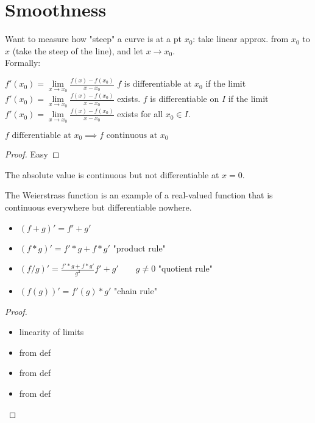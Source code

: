 \chapter{Smoothness}

Want to measure how "steep" a curve is at a pt $x_0$: take linear approx. from $x_0$ to $x$ (take the steep of the line), and let $x \to x_0$.\\
Formally:
\begin{definition}
	$f'(x_0) = \lim\limits_{x \to x_0} \frac{f(x) - f(x_0)}{x - x_0}$
	$f$ is differentiable at $x_0$ if the limit $f'(x_0) = \lim\limits_{x \to x_0} \frac{f(x) - f(x_0)}{x - x_0}$ exists.
	$f$ is differentiable on $I$ if the limit $f'(x_0) = \lim\limits_{x \to x_0} \frac{f(x) - f(x_0)}{x - x_0}$ exists for all $x_0 \in I$.
\end{definition}

\begin{property}
	$f \text{ differentiable at } x_0 \implies f  \text{ continuous at } x_0$ 
\end{property}
\begin{proof}
	Easy
\end{proof}
The absolute value is continuous but not differentiable at $x=0$.

The Weierstrass function is an example of a real-valued function that is continuous everywhere but differentiable nowhere.

\begin{property}
	\begin{itemize}
		\item $\left( f+g \right)' = f'+g'$
		\item $\left( f*g \right)' = f'*g+f*g'$ "product rule"
		\item $\left( f/g \right)' = \frac{f'*g+f*g'}{g^2}f'+g' \qquad g \neq 0$ "quotient rule"
		\item $\left( f(g) \right)' = f'(g)*g'$ "chain rule"
	\end{itemize}
\end{property}
\begin{proof}
	\begin{itemize}
		\item linearity of limits
		\item from def
		\item from def
		\item from def
	\end{itemize}
\end{proof}

